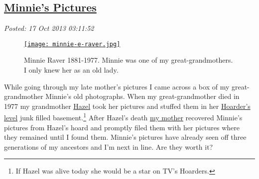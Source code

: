 %

\subsection*{\href{https://bakerjd99.wordpress.com/2013/10/16/minnies-pictures/}{Minnie's Pictures}}


\noindent\emph{Posted: 17 Oct 2013 03:11:52}
\vspace{6pt}




\captionsetup[figure]{labelformat=empty}
\begin{SCfigure}[1.5][!h]
\centering
\href{http://conceptcontrol.smugmug.com/People/Minnie-Raver/i-k6pnSJ4/A}{\texttt{[image: minnie-e-raver.jpg]}}
\caption[Minnie Raver 1881-1977. Minnie was one of my great-grandmothers.]{Minnie Raver 1881-1977. Minnie was one of my great-grandmothers. I only knew her as an old
lady.}
\label{fig:4230X0}
\end{SCfigure}


While going through my late mother's pictures I came across a box of my
great-grandmother Minnie's old photographs. When my great-grandmother
died in 1977 my grandmother
\href{http://conceptcontrol.smugmug.com/People/Grandparents-1/i-PBjmr7p/A}{Hazel}
took her pictures and stuffed them in her
\href{http://www.aetv.com/hoarders/}{Hoarder's level} junk filled
basement.\footnote{
If Hazel was alive today she would be a star on TV's Hoarders.
} After Hazel's death
\href{http://conceptcontrol.smugmug.com/People/The-Way-We-Were/i-Z64DmrR/A}{my
mother} recovered Minnie's pictures from Hazel's hoard and promptly
filed them with her pictures where they remained until I found them.
Minnie's pictures have already seen off three generations of my
ancestors and I'm next in line. Are they worth it?

